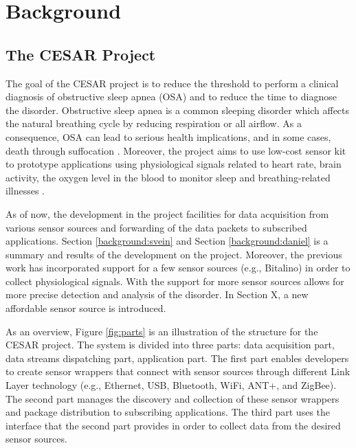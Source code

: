 \chapter{Background}

\section{The CESAR Project}
The goal of the CESAR project is to reduce the threshold to perform a clinical diagnosis of obstructive sleep apnea (OSA) and to reduce the time to diagnose the disorder. Obstructive sleep apnea is a common sleeping disorder which affects the natural breathing cycle by reducing respiration or all airflow. As a consequence, OSA can lead to serious health implications, and in some cases, death through suffocation \cite{cesarinfo}.  Moreover, the project aims to use low-cost sensor kit to prototype applications using physiological signals related to heart rate, brain activity, the oxygen level in the blood to monitor sleep and breathing-related illnesses \cite{cesar}.

As of now, the development in the project facilities for data acquisition from various sensor sources and forwarding of the data packets to subscribed applications. Section \ref{background:svein} and Section \ref{background:daniel} is a summary and results of the development on the project. Moreover, the previous work has incorporated support for a few sensor sources (e.g., Bitalino) in order to collect physiological signals. With the support for more sensor sources allows for more precise detection and analysis of the disorder. In Section X, a new affordable sensor source is introduced.

As an overview, Figure \ref{fig:parts} is an illustration of the structure for the CESAR project. The system is divided into three parts: data acquisition part, data streams dispatching part, application part. The first part enables developers to create sensor wrappers that connect with sensor sources through different Link Layer technology (e.g., Ethernet, USB, Bluetooth, WiFi, ANT+, and ZigBee). The second part manages the discovery and collection of these sensor wrappers and package distribution to subscribing applications. The third part uses the interface that the second part provides in order to collect data from the desired sensor sources.

